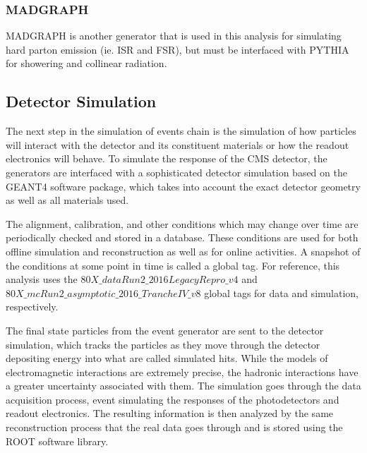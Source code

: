\subsubsection{MADGRAPH}

MADGRAPH is another generator that is used in this analysis for simulating hard parton emission (ie. ISR and FSR), but must be interfaced with PYTHIA for showering and collinear radiation.

\subsection{Detector Simulation}

The next step in the simulation of events chain is the simulation of how particles will interact with the detector and its constituent materials or how the readout electronics will behave. To simulate the response of the CMS detector, the generators are interfaced with a sophisticated detector simulation based on the GEANT4 software package, which takes into account the exact detector geometry as well as all materials used.

The alignment, calibration, and other conditions which may change over time are periodically checked and stored in a database. These conditions are used for both offline simulation and reconstruction as well as for online activities. A snapshot of the conditions at some point in time is called a global tag. For reference, this analysis uses the $80X\_dataRun2\_2016LegacyRepro\_v4$ and $80X\_mcRun2\_asymptotic\_2016\_TrancheIV\_v8$ global tags for data and simulation, respectively. 

The final state particles from the event generator are sent to the detector simulation, which tracks the particles as they move through the detector depositing energy into what are called simulated hits. While the models of electromagnetic interactions are extremely precise, the hadronic interactions have a greater uncertainty associated with them. The simulation goes through the data acquisition process, event simulating the responses of the photodetectors and readout electronics. The resulting information is then analyzed by the same reconstruction process that the real data goes through and is stored using the ROOT software library. 

